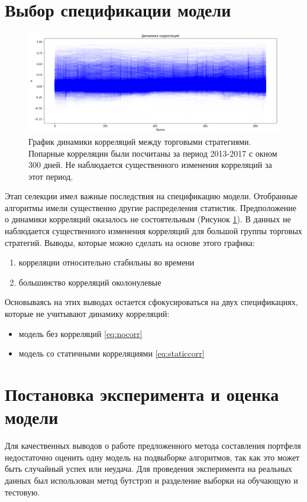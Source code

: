\section{Выбор спецификации модели}
\begin{figure}[t]
	\centering
	\includegraphics[width=\linewidth]{Thesis/images/correlations}
	\caption{График динамики корреляций между торговыми стратегиями. Попарные корреляции были посчитаны за период 2013-2017 с окном 300 дней. Не наблюдается существенного изменения корреляций за этот период.}
	\label{fig:correlations}
\end{figure}
Этап селекции имел важные последствия на спецификацию модели. Отобранные алгоритмы имели существенно другие распределения статистик. Предположение о динамики корреляций оказалось не состоятельным (Рисунок \ref{fig:correlations}). В данных не наблюдается существенного изменения корреляций для большой группы торговых стратегий. Выводы, которые можно сделать на основе этого графика:
\begin{enumerate}
	\item корреляции относительно стабильны во времени
	\item большинство корреляций околонулевые
\end{enumerate}

Основываясь на этих выводах остается сфокусироваться на двух спецификациях, которые не учитывают динамику корреляций:
\begin{itemize}
	\item модель без корреляций \eqref{eq:nocorr}
	\item модель со статичными корреляциями \eqref{eq:staticcorr}
\end{itemize}

\section{Постановка эксперимента и оценка модели}
Для качественных выводов о работе предложенного метода составления портфеля недостаточно оценить одну модель на подвыборке алгоритмов, так как это может быть случайный успех или неудача. Для проведения эксперимента на реальных данных был использован метод бутстрэп \citep{grimshaw1995} и разделение выборки на обучающую и тестовую. 

